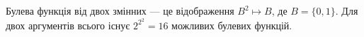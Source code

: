 %
%
^^I^^IБулева функція від двох змінних --- це відображення $B^2 \mapsto B$, де $B = \{0, 1\}$. Для двох аргументів всього існує $2^{2^2} = 16$ можливих булевих функцій.
